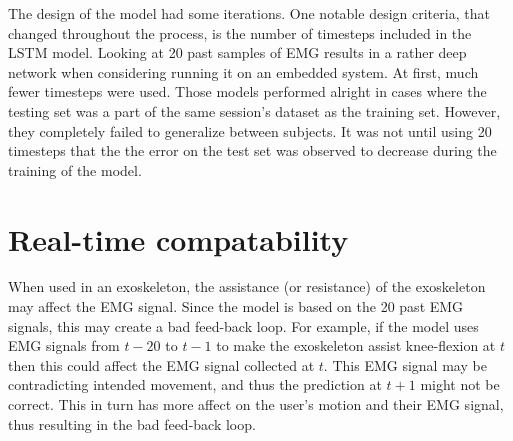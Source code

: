 \documentclass[../main.tex]{subfiles}
\begin{document}
The design of the model had some iterations. 
One notable design criteria, that changed throughout the process, is the number of timesteps included in the \ac{LSTM} model.
Looking at 20 past samples of \ac{EMG} results in a rather deep network when considering running it on an embedded system.
At first, much fewer timesteps were used.
Those models performed alright in cases where the testing set was a part of the same session's dataset as the training set.
However, they completely failed to generalize between subjects.
It was not until using 20 timesteps that the the error on the test set was observed to decrease during the training of the model.

\section{Real-time compatability}
\label{sec:discussion_real-time}
When used in an exoskeleton, the assistance (or resistance) of the exoskeleton may affect the \ac{EMG} signal.
Since the model is based on the 20 past \ac{EMG} signals, this may create a bad feed-back loop.
For example, if the model uses \ac{EMG} signals from $t-20$ to $t-1$ to make the exoskeleton assist knee-flexion at $t$ then this could affect the \ac{EMG} signal collected at $t$.
This \ac{EMG} signal may be contradicting intended movement, and thus the prediction at $t+1$ might not be correct.
This in turn has more affect on the user's motion and their \ac{EMG} signal, thus resulting in the bad feed-back loop.
\end{document}

